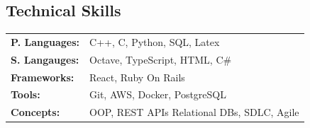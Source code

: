  \begin{minipage}[t]{0.5\textwidth}
    \begin{small}
        \section*{Technical Skills}
            \begin{tabular}{ l p{} }
            \textbf{P. Languages:} & C++, C, Python, SQL, Latex \\
            \textbf{S. Langauges:} & Octave, TypeScript, HTML, C\#\\
            \textbf{Frameworks:} & React, Ruby On Rails \\
            \textbf{Tools:} & Git, AWS, Docker, PostgreSQL \\
            \textbf{Concepts:} & OOP, REST APIs Relational DBs, SDLC, Agile
        \end{tabular}
    \end{small}
\end{minipage}